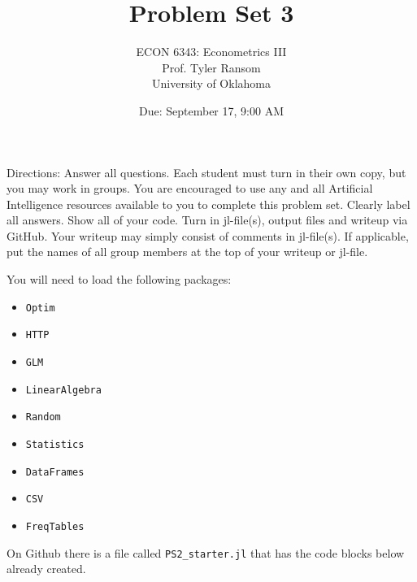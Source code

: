 \documentclass[12pt,english]{article}
\begin{document}
\title{Problem Set 3}
\author{ECON 6343: Econometrics III\\
Prof. Tyler Ransom\\
University of Oklahoma}
\date{Due: September 17, 9:00 AM}

\maketitle
Directions: Answer all questions. Each student must turn in their own copy, but you may work in groups. You are encouraged to use any and all Artificial Intelligence resources available to you to complete this problem set. Clearly label all answers. Show all of your code. Turn in jl-file(s), output files and writeup via GitHub. Your writeup may simply consist of comments in jl-file(s). If applicable, put the names of all group members at the top of your writeup or jl-file.

You will need to load the following packages:
\begin{itemize}
    \item[~] \texttt{Optim} 
    \item[~] \texttt{HTTP} 
    \item[~] \texttt{GLM} 
    \item[~] \texttt{LinearAlgebra} 
    \item[~] \texttt{Random} 
    \item[~] \texttt{Statistics} 
    \item[~] \texttt{DataFrames} 
    \item[~] \texttt{CSV} 
    \item[~] \texttt{FreqTables}
\end{itemize}

On Github there is a file called \texttt{PS2\_starter.jl} that has the code blocks below already created.
\end{document}
